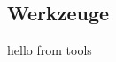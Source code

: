 \documentclass[.../Dokumentation.tex]{subfiles}
\begin{document}
    \subsection{Werkzeuge}\label{sec-components-tools}
    hello from tools
\end{document}
